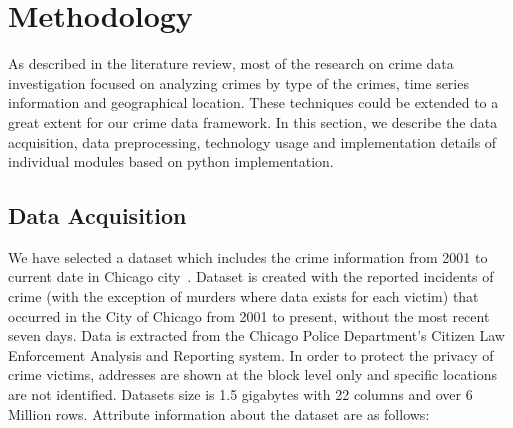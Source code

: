 \section{Methodology}

As described in the literature review, most of the research on crime
data investigation focused on analyzing crimes by type of the crimes,
time series information and geographical location. These techniques
could be extended to a great extent for our crime data framework. In
this section, we describe the data acquisition, data preprocessing,
technology usage and implementation details of individual modules
based on python implementation. 

\subsection{Data Acquisition}\label{dataset}

We have selected a dataset which includes the crime information from
2001 to current date in Chicago
city~\cite{hid-sp18-409-www-data.gov}. Dataset is created with the
reported incidents of crime (with the exception of murders where data
exists for each victim) that occurred in the City of Chicago from 2001
to present, without the most recent seven days. Data is extracted from
the Chicago Police Department's Citizen Law Enforcement Analysis and
Reporting system. In order to protect the privacy of crime victims,
addresses are shown at the block level only and specific locations are
not identified. Datasets size is 1.5 gigabytes with 22 columns and
over 6 Million rows. Attribute information about the dataset are as
follows:

